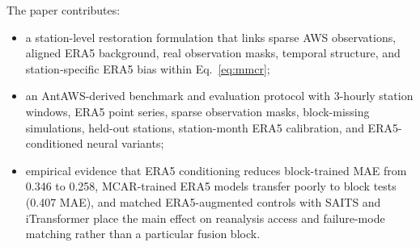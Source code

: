 The paper contributes:
\begin{itemize}
  \item a station-level restoration formulation that links sparse AWS observations, aligned ERA5 background, real observation masks, temporal structure, and station-specific ERA5 bias within Eq.~\ref{eq:mmcr};
  \item an AntAWS-derived benchmark and evaluation protocol with 3-hourly station windows, ERA5 point series, sparse observation masks, block-missing simulations, held-out stations, station-month ERA5 calibration, and ERA5-conditioned neural variants;
  \item empirical evidence that ERA5 conditioning reduces block-trained MAE from 0.346 to 0.258, MCAR-trained ERA5 models transfer poorly to block tests (0.407 MAE), and matched ERA5-augmented controls with SAITS and iTransformer place the main effect on reanalysis access and failure-mode matching rather than a particular fusion block.
\end{itemize}
